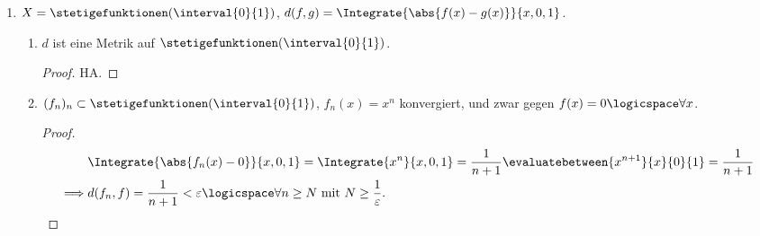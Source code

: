 \begin{beispiele}
\begin{enumerate}
\begin{enumerate}[label=\textbf{\arabic*. Beh}]
        \end{enumerate}
        \item \( X=\stetigefunktionen(\interval{0}{1}) \), \( d(f,g)=\Integrate{\abs{f(x)-g(x)}}{x,0,1} \).
        \begin{enumerate}[label=\textbf{\arabic*. Beh}]
            
            \item \( d \) ist eine Metrik auf \( \stetigefunktionen(\interval{0}{1}) \).
            \begin{proof}
                HA. %
            \end{proof}
            
            \item \( (f_n)_n\subset \stetigefunktionen(\interval{0}{1}) \), \( f_n(x)=x^n \) konvergiert, und zwar gegen \( f(x)=0\logicspace\forall x \).
            \begin{proof}
                \begin{align*}
                    &\Integrate{\abs{f_n(x)-0}}{x,0,1}=\Integrate{x^n}{x,0,1}=\frac{1}{n+1}\evaluatebetween{x^{n+1}}{x}{0}{1}=\frac{1}{n+1}\\ %
                    \implies &d(f_n,f)=\frac{1}{n+1}<\varepsilon\logicspace\forall n\geq N \text{ mit } N \geq \frac{1}{\varepsilon}.
                \end{align*}
                
            \end{proof}
            
        \end{enumerate}
        
    \end{enumerate}
\end{beispiele}






